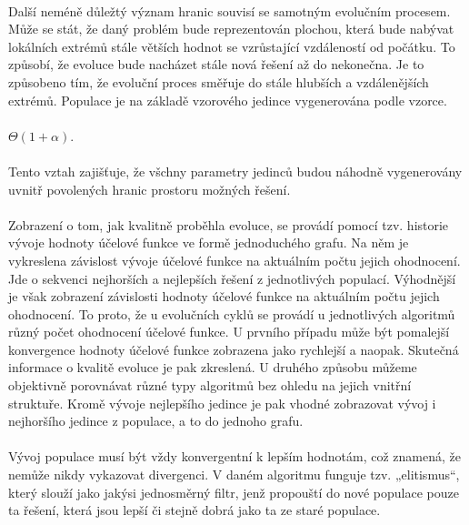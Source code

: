 \documentclass[bc,male,java,dept460]{diploma}		%
\begin{document}
\paragraph*{}
Další neméně důležtý význam hranic souvisí se samotným evolučním procesem. Může se stát, že daný problém bude reprezentován plochou, která bude nabývat lokálních extrémů stále větších hodnot se vzrůstající vzdáleností od počátku. To způsobí, že evoluce bude nacházet stále nová řešení až do nekonečna. Je to způsobeno tím, že evoluční proces směřuje do stále hlubších a vzdálenějších extrémů.
Populace je na základě vzorového jedince vygenerována podle vzorce.

\paragraph*{}
$\Theta(1+\alpha)$.  

\paragraph*{}
Tento vztah zajišťuje, že všchny parametry jedinců budou náhodně vygenerovány uvnitř povolených hranic prostoru možných řešení.

\paragraph*{}
Zobrazení o tom, jak kvalitně proběhla evoluce, se provádí pomocí tzv. historie vývoje hodnoty účelové funkce ve formě jednoduchého grafu. Na něm je vykreslena závislost vývoje účelové funkce na aktuálním počtu jejich ohodnocení. Jde o sekvenci nejhorších a nejlepších řešení z jednotlivých populací. Výhodnější je však zobrazení závislosti hodnoty účelové funkce na aktuálním počtu jejich ohodnocení. To proto, že u evolučních cyklů se provádí u jednotlivých algoritmů různý počet ohodnocení účelové funkce. U prvního případu může být pomalejší konvergence hodnoty účelové funkce zobrazena jako rychlejší a naopak. Skutečná informace o kvalitě evoluce je pak zkreslená. U druhého způsobu můžeme objektivně porovnávat různé typy algoritmů bez ohledu na jejich vnitřní struktuře.
Kromě vývoje nejlepšího jedince je pak vhodné zobrazovat vývoj i nejhoršího jedince z populace, a to do jednoho grafu.

\paragraph*{}
Vývoj populace musí být vždy konvergentní k lepším hodnotám, což znamená, že nemůže nikdy vykazovat divergenci. V daném algoritmu funguje tzv. „elitismus“, který slouží jako jakýsi jednosměrný filtr, jenž propouští do nové populace pouze ta řešení, která jsou lepší či stejně dobrá jako ta ze staré populace.
\end{document}
